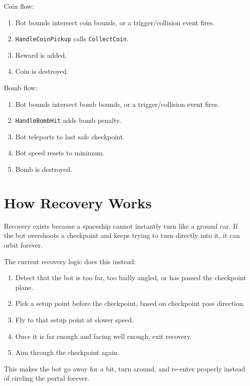 \documentclass[11pt]{article}
\newcommand{\code}[1]{{\footnotesize\texttt{#1}}}
\begin{document}
Coin flow:

\begin{enumerate}
    \item Bot bounds intersect coin bounds, or a trigger/collision event fires.
    \item \code{HandleCoinPickup} calls \code{CollectCoin}.
    \item Reward is added.
    \item Coin is destroyed.
\end{enumerate}

Bomb flow:

\begin{enumerate}
    \item Bot bounds intersect bomb bounds, or a trigger/collision event fires.
    \item \code{HandleBombHit} adds bomb penalty.
    \item Bot teleports to last safe checkpoint.
    \item Bot speed resets to minimum.
    \item Bomb is destroyed.
\end{enumerate}

\section{How Recovery Works}

Recovery exists because a spaceship cannot instantly turn like a ground car. If the bot overshoots a checkpoint and keeps trying to turn directly into it, it can orbit forever.

The current recovery logic does this instead:

\begin{enumerate}
    \item Detect that the bot is too far, too badly angled, or has passed the checkpoint plane.
    \item Pick a setup point before the checkpoint, based on checkpoint pass direction.
    \item Fly to that setup point at slower speed.
    \item Once it is far enough and facing well enough, exit recovery.
    \item Aim through the checkpoint again.
\end{enumerate}

This makes the bot go away for a bit, turn around, and re-enter properly instead of circling the portal forever.
\end{document}
